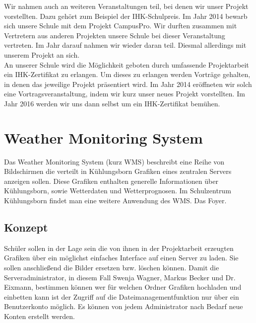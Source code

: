 \documentclass[a4paper,oneside,12pt,titlepage]{article}
\begin{document}
Wir nahmen auch an weiteren Veranstaltungen teil, bei denen wir unser Projekt vorstellten. Dazu gehört zum Beispiel der IHK-Schulpreis. Im Jahr 2014 bewarb sich unsere Schule mit dem Projekt CampusPro. Wir durften zusammen mit Vertretern aus anderen Projekten unsere Schule bei dieser Veranstaltung vertreten. Im Jahr darauf nahmen wir wieder daran teil. Diesmal allerdings mit unserem Projekt an sich.\\ An unserer Schule wird die Möglichkeit geboten durch umfassende Projektarbeit ein IHK-Zertifikat zu erlangen. Um dieses zu erlangen werden Vorträge gehalten, in denen das jeweilige Projekt präsentiert wird. Im Jahr 2014 eröffneten wir solch eine Vortragsveranstaltung, indem wir kurz unser neues Projekt vorstellten. Im Jahr 2016 werden wir uns dann selbst um ein IHK-Zertifikat bemühen.

\section{Weather Monitoring System}
Das Weather Monitoring System (kurz WMS) beschreibt eine Reihe von Bildschirmen die verteilt in Kühlungsborn Grafiken eines zentralen Servers anzeigen sollen. Diese Grafiken enthalten generelle Informationen über Kühlungsborn, sowie Wetterdaten und Wetterprognosen. Im Schulzentrum Kühlungsborn findet man eine weitere Anwendung des WMS. Das Foyer.

\subsection{Konzept} %
Schüler sollen in der Lage sein die von ihnen in der Projektarbeit erzeugten Grafiken über ein möglichst einfaches Interface auf einen Server zu laden. Sie sollen anschließend die Bilder ersetzen bzw. löschen können. Damit die Serveradministrator, in diesem Fall Swenja Wagner, Markus Becker und Dr. Eixmann, bestimmen können wer für welchen Ordner Grafiken hochladen und einbetten kann ist der Zugriff auf die Dateimanagementfunktion nur über ein Benutzerkonto möglich. Es können von jedem Administrator nach Bedarf neue Konten erstellt werden.
\end{document}

